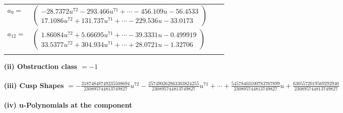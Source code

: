 \documentclass[1p]{elsarticle_modified}
\theoremstyle{definition}
\begin{document}
\begin{tabular}{m{7pt} m{180pt} m{7pt} m{180pt} }
\flushright $a_{9}=$&$\begin{pmatrix}-28.7372 u^{72}-293.466 u^{71}+\cdots-456.109 u-56.4533\\17.1086 u^{72}+131.737 u^{71}+\cdots-229.536 u-33.0173\end{pmatrix}$ \\
\flushright $a_{12}=$&$\begin{pmatrix}1.86084 u^{72}+5.66695 u^{71}+\cdots-39.3331 u-0.499919\\33.5377 u^{72}+304.934 u^{71}+\cdots+28.0721 u-1.32706\end{pmatrix}$\\&\end{tabular}
\flushleft \textbf{(ii) Obstruction class $= -1$}\\~\\
\flushleft \textbf{(iii) Cusp Shapes $= -\frac{31874848749235508694}{230895744813749827} u^{72}-\frac{257490262863303824255}{230895744813749827} u^{71}+\cdots+\frac{54578403100783767899}{230895744813749827} u+\frac{6305572019569292940}{230895744813749827}$}\\~\\
\newpage\renewcommand{\arraystretch}{1}
\flushleft \textbf{(iv) u-Polynomials at the component}\newline \\
\end{document}
